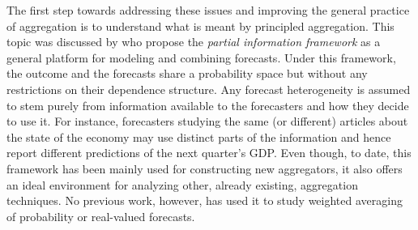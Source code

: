 \documentclass[12pt]{article}
\theoremstyle{definition}
\theoremstyle{definition}
\begin{document}

The first step towards addressing these issues and improving the general practice of aggregation  is to understand what is meant by principled aggregation. This topic was discussed by \cite{satopaamodeling2, satopaamodeling} who propose the \textit{partial information 
framework} as a general platform for modeling and combining forecasts. Under this framework, the outcome and the forecasts share a probability space but without any restrictions on their dependence structure. Any forecast heterogeneity  is assumed to stem purely from information available to the forecasters and how they decide to use it. For instance, forecasters studying the same (or different) articles about the state of the economy may use distinct parts of the information and hence report different predictions of the next quarter's GDP. 
Even though, to date, this framework has been mainly used for constructing new aggregators, it also offers an ideal environment for analyzing other, already existing, aggregation techniques. No previous work, however, has used it to study weighted averaging of probability or real-valued forecasts.


%
%



\end{document}
